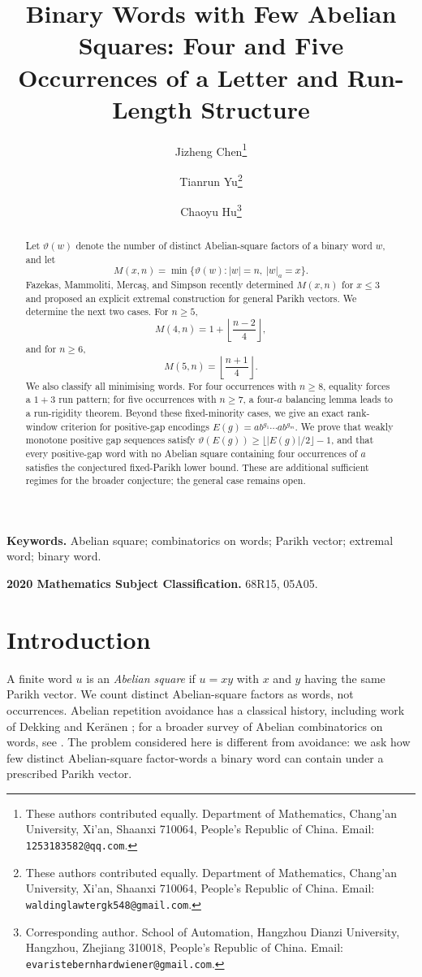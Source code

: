 \documentclass[11pt]{article}
\title{Binary Words with Few Abelian Squares: Four and Five Occurrences of a Letter and Run-Length Structure}
\author{Jizheng Chen\thanks{These authors contributed equally. Department of Mathematics, Chang'an University, Xi'an, Shaanxi 710064, People's Republic of China. Email: \texttt{1253183582@qq.com}.}
\and
Tianrun Yu\thanks{These authors contributed equally. Department of Mathematics, Chang'an University, Xi'an, Shaanxi 710064, People's Republic of China. Email: \texttt{waldinglawtergk548@gmail.com}.}
\and
Chaoyu Hu\thanks{Corresponding author. School of Automation, Hangzhou Dianzi University, Hangzhou, Zhejiang 310018, People's Republic of China. Email: \texttt{evaristebernhardwiener@gmail.com}.}}
\date{}
\theoremstyle{definition}
\newcommand{\thetaas}{\vartheta}
\begin{document}
\maketitle

\begin{abstract}
Let $\thetaas(w)$ denote the number of distinct Abelian-square factors of a binary word $w$, and let
\[
 M(x,n)=\min\{\thetaas(w): |w|=n,\ |w|_a=x\}.
\]
Fazekas, Mammoliti, Merca\c{s}, and Simpson recently determined $M(x,n)$ for $x\le3$ and proposed an explicit extremal construction for general Parikh vectors. We determine the next two cases. For $n\ge5$,
\[
 M(4,n)=1+\left\lfloor\frac{n-2}{4}\right\rfloor,
\]
and for $n\ge6$,
\[
 M(5,n)=\left\lfloor\frac{n+1}{4}\right\rfloor.
\]
We also classify all minimising words.  For four occurrences with $n\ge8$, equality forces a $1+3$ run pattern; for five occurrences with $n\ge7$, a four-$a$ balancing lemma leads to a run-rigidity theorem.  Beyond these fixed-minority cases, we give an exact rank-window criterion for positive-gap encodings $E(g)=ab^{g_1}\cdots ab^{g_m}$.  We prove that weakly monotone positive gap sequences satisfy $\thetaas(E(g))\ge\lfloor |E(g)|/2\rfloor-1$, and that every positive-gap word with no Abelian square containing four occurrences of $a$ satisfies the conjectured fixed-Parikh lower bound.  These are additional sufficient regimes for the broader conjecture; the general case remains open.
\end{abstract}

\medskip
\noindent\textbf{Keywords.} Abelian square; combinatorics on words; Parikh vector; extremal word; binary word.

\smallskip
\noindent\textbf{2020 Mathematics Subject Classification.} 68R15, 05A05.

\section{Introduction}

A finite word $u$ is an \emph{Abelian square} if $u=xy$ with $x$ and $y$ having the same Parikh vector. We count distinct Abelian-square factors as words, not occurrences. Abelian repetition avoidance has a classical history, including work of Dekking and Ker\"anen \cite{Dekking1979,Keranen1992}; for a broader survey of Abelian combinatorics on words, see \cite{FiciPuzynina2023}. The problem considered here is different from avoidance: we ask how few distinct Abelian-square factor-words a binary word can contain under a prescribed Parikh vector.
\end{document}
